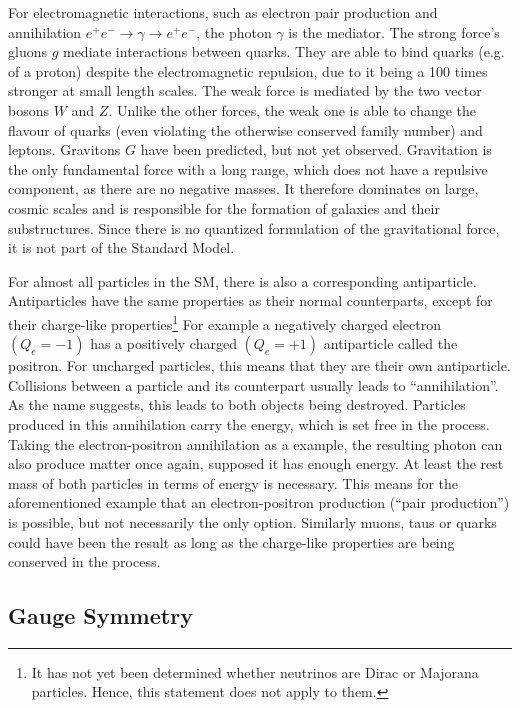 For electromagnetic interactions, such as electron pair production and annihilation $e^+ e^- \rightarrow \gamma \rightarrow e^+ e^-$, the photon $\gamma$ is the mediator. The strong force's gluons $g$ mediate interactions between quarks. They are able to bind quarks (e.g. of a proton) despite the electromagnetic repulsion, due to it being a 100 times stronger at small length scales. The weak force is mediated by the two vector bosons $W$ and $Z$. Unlike the other forces, the weak one is able to change the flavour of quarks (even violating the otherwise conserved family number) and leptons. Gravitons $G$ have been predicted, but not yet observed. Gravitation is the only fundamental force with a long range, which does not have a repulsive component, as there are no negative masses. It therefore dominates on large, cosmic scales and is responsible for the formation of galaxies and their substructures. Since there is no quantized formulation of the gravitational force, it is not part of the Standard Model.

For almost all particles in the SM, there is also a corresponding antiparticle. Antiparticles have the same properties as their normal counterparts, except for their charge-like properties\footnote{It has not yet been determined whether neutrinos are Dirac or Majorana particles. Hence, this statement does not apply to them.} For example a negatively charged electron $(Q_e = -1)$ has a positively charged $(Q_e = +1)$ antiparticle called the positron. For uncharged particles, this means that they are their own antiparticle. Collisions between a particle and its counterpart usually leads to ``annihilation''. As the name suggests, this leads to both objects being destroyed. Particles produced in this annihilation carry the energy, which is set free in the process. Taking the electron-positron annihilation as a example, the resulting photon can also produce matter once again, supposed it has enough energy. At least the rest mass of both particles in terms of energy is necessary. This means for the aforementioned example that an electron-positron production (``pair production'') is possible, but not necessarily the only option. Similarly muons, taus or quarks could have been the result as long as the charge-like properties are being conserved in the process.


\subsection{Gauge Symmetry}

